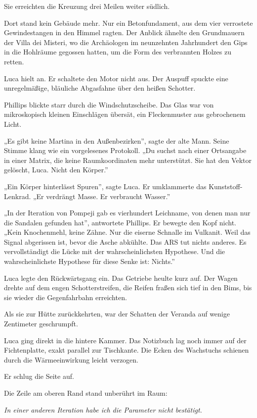 \documentclass[
  ngerman,
]{article}
\begin{document}
Sie erreichten die Kreuzung drei Meilen weiter südlich.

Dort stand kein Gebäude mehr. Nur ein Betonfundament, aus dem vier
verrostete Gewindestangen in den Himmel ragten. Der Anblick ähnelte den
Grundmauern der Villa dei Misteri, wo die Archäologen im neunzehnten
Jahrhundert den Gips in die Hohlräume gegossen hatten, um die Form des
verbrannten Holzes zu retten.

Luca hielt an. Er schaltete den Motor nicht aus. Der Auspuff spuckte
eine unregelmäßige, bläuliche Abgasfahne über den heißen Schotter.

Phillips blickte starr durch die Windschutzscheibe. Das Glas war von
mikroskopisch kleinen Einschlägen übersät, ein Fleckenmuster aus
gebrochenem Licht.

„Es gibt keine Martina in den Außenbezirken'', sagte der alte Mann.
Seine Stimme klang wie ein vorgelesenes Protokoll. „Du suchst nach einer
Ortsangabe in einer Matrix, die keine Raumkoordinaten mehr unterstützt.
Sie hat den Vektor gelöscht, Luca. Nicht den Körper.''

„Ein Körper hinterlässt Spuren'', sagte Luca. Er umklammerte das
Kunststoff-Lenkrad. „Er verdrängt Masse. Er verbraucht Wasser.''

„In der Iteration von Pompeji gab es vierhundert Leichname, von denen
man nur die Sandalen gefunden hat'', antwortete Phillips. Er bewegte den
Kopf nicht. „Kein Knochenmehl, keine Zähne. Nur die eiserne Schnalle im
Vulkanit. Weil das Signal abgerissen ist, bevor die Asche abkühlte. Das
ARS tut nichts anderes. Es vervollständigt die Lücke mit der
wahrscheinlichsten Hypothese. Und die wahrscheinlichste Hypothese für
diese Senke ist: Nichts.''

Luca legte den Rückwärtsgang ein. Das Getriebe heulte kurz auf. Der
Wagen drehte auf dem engen Schotterstreifen, die Reifen fraßen sich tief
in den Bims, bis sie wieder die Gegenfahrbahn erreichten.

Als sie zur Hütte zurückkehrten, war der Schatten der Veranda auf wenige
Zentimeter geschrumpft.

Luca ging direkt in die hintere Kammer. Das Notizbuch lag noch immer auf
der Fichtenplatte, exakt parallel zur Tischkante. Die Ecken des
Wachstuchs schienen durch die Wärmeeinwirkung leicht verzogen.

Er schlug die Seite auf.

Die Zeile am oberen Rand stand unberührt im Raum:

\emph{In einer anderen Iteration habe ich die Parameter nicht
bestätigt.}
\end{document}
